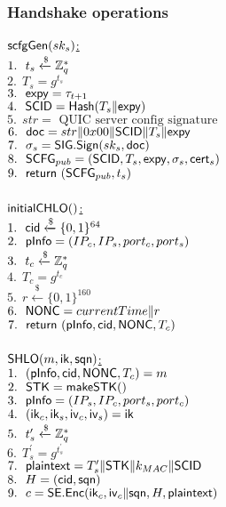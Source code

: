 \subsubsection{Handshake operations}
\underline{$\mathsf{scfgGen}(sk_s)$:} \\
 $1.\ \ t_s \xleftarrow{\$} \mathbb{Z}_{q}^{\ast}$ \\
 $2.\ \ T_s = g^{t_s}$ \\
 $3.\ \ \mathsf{expy} = \tau_{t+1}$ \\
 $4.\ \ \mathsf{SCID} = \mathsf{Hash}(T_s \| \mathsf{expy})$ \\
 $5.\ \ str = \text{ QUIC server config signature }$ \\
 $6.\ \ \mathsf{doc} = str \| 0x00 \| \mathsf{SCID} \| T_s \| \mathsf{expy}$ \\
 $7.\ \ \sigma_s = \mathsf{SIG}.\mathsf{Sign}(sk_s, \mathsf{doc})$ \\
 $8.\ \ \mathsf{SCFG}_{pub} = (\mathsf{SCID}, T_s, \mathsf{expy}, \sigma_s, \mathsf{cert}_s)$ \\
 $9.\ \ \mathsf{return}\ (\mathsf{SCFG}_{pub}, t_s)$ \\
\\
\underline{$\mathsf{initialCHLO}()$:} \\
 $1.\ \ \mathsf{cid} \xleftarrow{\$} \{0,1\}^{64} $ \\
 $2.\ \ \mathsf{pInfo} = (IP_c, IP_s, port_c, port_s)$ \\
 $3.\ \ t_c \xleftarrow{\$} \mathbb{Z}_{q}^{\ast}$ \\
 $4.\ \ T_c = g^{t_c}$ \\
 $5.\ \ r \xleftarrow{\$} \{0,1\}^{160}$ \\
 $6.\ \ \mathsf{NONC} = currentTime \| r$ \\
 $7.\ \ \mathsf{return}\ (\mathsf{pInfo}, \mathsf{cid}, \mathsf{NONC}, T_c)$ \\
\\
\underline{$\mathsf{SHLO}(m, \mathsf{ik}, \mathsf{sqn})$:} \\
 $1.\ \ (\mathsf{pInfo}, \mathsf{cid}, \mathsf{NONC}, T_c) = m$ \\
 $2.\ \ \mathsf{STK} = \mathsf{makeSTK}()$ \\
 $3.\ \ \mathsf{pInfo} = (IP_s, IP_c, port_s, port_c)$ \\
 $4.\ \ (\mathsf{ik}_c, \mathsf{ik}_s, \mathsf{iv}_c, \mathsf{iv}_s) = \mathsf{ik}$ \\
 $5.\ \ t_s^{\prime} \xleftarrow{\$} \mathbb{Z}_{q}^{\ast}$ \\
 $6.\ \ T_s^{\prime} = g^{t_s^{\prime}}$ \\
 $7.\ \ \mathsf{plaintext} = T_{s}^{\prime} \| \mathsf{STK} \| k_{MAC} \| \mathsf{SCID}$\\
 $8.\ \ H = (\mathsf{cid}, \mathsf{sqn})$ \\
 $9.\ \ c = \mathsf{SE}.\mathsf{Enc}(\mathsf{ik}_c, \mathsf{iv}_c \| \mathsf{sqn}, H, \mathsf{plaintext})$ \\
